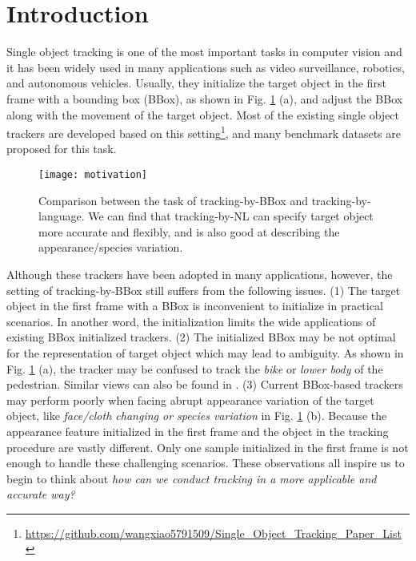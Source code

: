 \documentclass[final]{cvpr}
\begin{document}
\section{Introduction}
Single object tracking is one of the most important tasks in computer vision and it has been widely used in many applications such as video surveillance, robotics, and autonomous vehicles. Usually, they initialize the target object in the first frame with a bounding box (BBox), as shown in Fig. \ref{motivation} (a), and adjust the BBox along with the movement of the target object. Most of the existing single object trackers \cite{Wang_2018_CVPR, Henriques2015High, hare2016struck, held2016GOTURN, Yun2017ADNet, wang2019GANTrack} are developed based on this setting\footnote{\url{https://github.com/wangxiao5791509/Single_Object_Tracking_Paper_List}}, and many benchmark datasets \cite{Wu2013Online, Liang2015Encoding, wu2015object, mueller2016benchmarkuav20l, huang2019got10k, fan2019lasot, valmadre2018longOxUVA} are proposed for this task.   


\begin{figure} 
\center
\texttt{[image: motivation]}
\caption{Comparison between the task of tracking-by-BBox and tracking-by-language. We can find that tracking-by-NL can specify target object more accurate and flexibly, and is also good at describing the appearance/species variation.}
\label{motivation}
\end{figure} 	

Although these trackers have been adopted in many applications, however, the setting of tracking-by-BBox still suffers from the following issues. 
(1) The target object in the first frame with a BBox is inconvenient to initialize in practical scenarios. In another word, the initialization limits the wide applications of existing BBox initialized trackers. 
(2) The initialized BBox may be not optimal for the representation of target object which may lead to ambiguity. As shown in Fig. \ref{motivation} (a), the tracker may be confused to track the \emph{bike} or \emph{lower body} of the pedestrian. Similar views can also be found in \cite{li2017tracking, wang2018describe, feng2019robust, yang2019grounding}. 
(3) Current BBox-based trackers may perform poorly when facing abrupt appearance variation of the target object, like \emph{face/cloth changing or species variation} in Fig. \ref{motivation} (b). Because the appearance feature initialized in the first frame and the object in the tracking procedure are vastly different. Only one sample initialized in the first frame is not enough to handle these challenging scenarios. 
These observations all inspire us to begin to think about \emph{how can we conduct tracking in a more applicable and accurate way?} 
\end{document}
